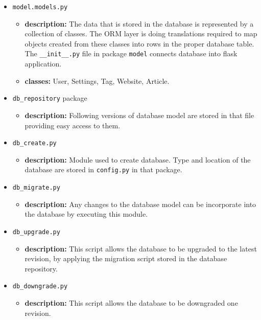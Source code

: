 \documentclass[12pt]{article}
\begin{document}
\begin{itemize}
	\item \texttt{model.models.py}
	\begin{itemize}
		\item \textbf{description:} The data that is stored in the database is represented by a collection of classes. The ORM layer is doing translations required to map objects created from these classes into rows in the proper database table. The \texttt{\_\_init\_\_.py} file in package \texttt{model} connects database into flask application.
		
		\item \textbf{classes:} User, Settings, Tag, Website, Article.
	\end{itemize}
	
	\item \texttt{db\_repository} package 
	\begin{itemize}
		\item \textbf{description:} Following versions of database model are stored in that file providing easy access to them.
	\end{itemize}
	
	\item \texttt{db\_create.py}
	\begin{itemize}
		\item \textbf{description:} Module used to create database. Type and location of the database are stored in \texttt{config.py} in that package.
	\end{itemize}
	
	\item \texttt{db\_migrate.py}
	\begin{itemize}
		\item \textbf{description:} Any changes to the database model can be incorporate into the database by executing this module. 
	\end{itemize}
	
	\item \texttt{db\_upgrade.py}
	\begin{itemize}
		\item \textbf{description:} This script allows the database to be upgraded to the latest revision, by applying the migration script stored in the database repository.
	\end{itemize}
	
	\item \texttt{db\_downgrade.py}
	\begin{itemize}
		\item \textbf{description:} This script allows the database to be downgraded one revision.
	\end{itemize}
	

\end{itemize}
\end{document}
